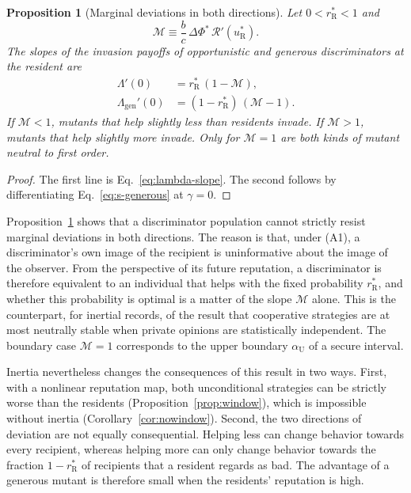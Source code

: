 \documentclass[10pt]{wlscirep}
\newcommand{\Rmap}{\mathscr{R}}            %
\newcommand{\rR}{r_{\mathrm{R}}^{*}}
\newcommand{\uR}{u_{\mathrm{R}}^{*}}
\newcommand{\dPhi}{\Delta\Phi^{*}}
\theoremstyle{plain}
\newtheorem{proposition}[lemma]{Proposition}
\theoremstyle{remark}
\begin{document}
\begin{proposition}[Marginal deviations in both directions]\label{prop:twosided}
Let $0<\rR<1$ and
\begin{equation}
\mathcal M\equiv\frac{b}{c}\,\dPhi\,\Rmap'(\uR).
\label{eq:s-M}
\end{equation}
The slopes of the invasion payoffs of opportunistic and generous discriminators at the resident are
\begin{equation}
\begin{aligned}
\Lambda'(0)&=\rR\,(1-\mathcal M),\\
\Lambda_{\mathrm{gen}}'(0)&=(1-\rR)\,(\mathcal M-1).
\end{aligned}
\label{eq:s-twosided}
\end{equation}
If $\mathcal M<1$, mutants that help slightly less than residents invade. If $\mathcal M>1$, mutants that help slightly more invade. Only for $\mathcal M=1$ are both kinds of mutant neutral to first order.
\end{proposition}
\begin{proof}
The first line is Eq.~\eqref{eq:lambda-slope}. The second follows by differentiating Eq.~\eqref{eq:s-generous} at $\gamma=0$.
\end{proof}

Proposition~\ref{prop:twosided} shows that a discriminator population cannot strictly resist marginal deviations in both directions. The reason is that, under (A1), a discriminator's own image of the recipient is uninformative about the image of the observer. From the perspective of its future reputation, a discriminator is therefore equivalent to an individual that helps with the fixed probability $\rR$, and whether this probability is optimal is a matter of the slope $\mathcal M$ alone. This is the counterpart, for inertial records, of the result that cooperative strategies are at most neutrally stable when private opinions are statistically independent. The boundary case $\mathcal M=1$ corresponds to the upper boundary $\alpha_{\mathrm U}$ of a secure interval.

Inertia nevertheless changes the consequences of this result in two ways. First, with a nonlinear reputation map, both unconditional strategies can be strictly worse than the residents (Proposition~\ref{prop:window}), which is impossible without inertia (Corollary~\ref{cor:nowindow}). Second, the two directions of deviation are not equally consequential. Helping less can change behavior towards every recipient, whereas helping more can only change behavior towards the fraction $1-\rR$ of recipients that a resident regards as bad. The advantage of a generous mutant is therefore small when the residents' reputation is high.
\end{document}
